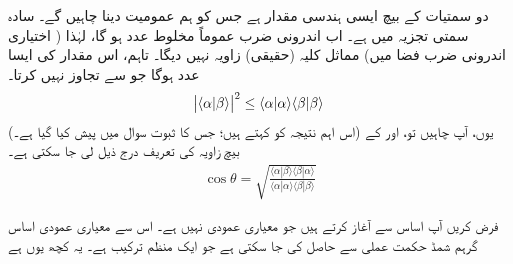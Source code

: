 دو  سمتیات کے بیچ    ایسی    ہندسی مقدار  ہے جس کو ہم عمومیت دینا چاہیں گے۔ سادہ سمتی تجزیہ میں 
  ہے۔ اب  اندرونی ضرب  عموماً مخلوط عدد ہو گا،    لہٰذا  (  اختیاری اندرونی ضرب فضا میں) مماثل کلیہ  (حقیقی)  زاویہ  نہیں دیگا۔ تاہم،  اس مقدار کی    ایسا  عدد ہوگا جو  سے تجاوز نہیں کرتا۔
\begin{align}
	\abs{\langle\alpha|\beta\rangle}^2\leq\langle\alpha|\alpha\rangle\langle\beta|\beta\rangle
\end{align}
(اس اہم نتیجہ کو   کہتے ہیں؛  جس کا ثبوت سوال  میں پیش کیا گیا ہے۔)  یوں،  آپ چاہیں تو،   اور  کے بیچ زاویہ کی  تعریف درج ذیل  لی جا سکتی ہے۔
\begin{align}
	\cos\theta = \sqrt{\frac{\langle\alpha|\beta\rangle\langle\beta|\alpha\rangle}{\langle\alpha|\alpha\rangle\langle\beta|\beta\rangle}}
\end{align}

فرض کریں آپ اساس  سے آغاز کرتے ہیں جو معیاری عمودی نہیں ہے۔ اس سے معیاری عمودی اساس  گرہم شمڈ حکمت عملی سے حاصل کی جا سکتی ہے جو ایک منظم ترکیب ہے۔ یہ کچھ یوں ہے

